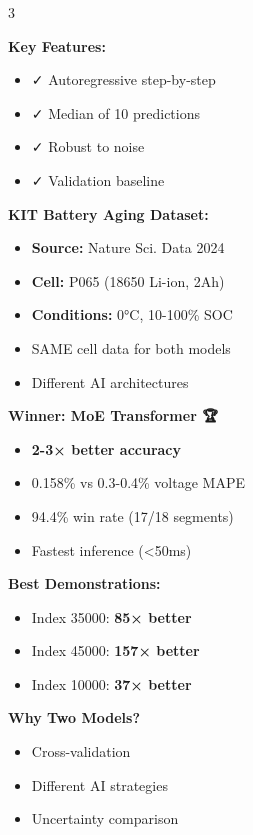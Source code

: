 \documentclass[final,a0paper,portrait]{a0poster}
\begin{document}
\begin{multicols}{3}
\begin{bluebox}[title=🔬 Model 2: Deep Ensemble]
\textbf{Key Features:}
\begin{itemize}
    \item ✓ Autoregressive step-by-step
    \item ✓ Median of 10 predictions
    \item ✓ Robust to noise
    \item ✓ Validation baseline
\end{itemize}
\end{bluebox}

\vspace{1cm}

\begin{orangebox}[title=📊 Dataset]
\large
\textbf{KIT Battery Aging Dataset:}

\begin{itemize}
    \item \textbf{Source:} Nature Sci. Data 2024
    \item \textbf{Cell:} P065 (18650 Li-ion, 2Ah)
    \item \textbf{Conditions:} 0°C, 10-100\% SOC
    \item SAME cell data for both models
    \item Different AI architectures
\end{itemize}
\end{orangebox}

\vspace{1cm}

\begin{bluebox}[title=✨ Key Findings]
\large

\textbf{Winner: MoE Transformer 🏆}
\begin{itemize}
    \item \textbf{2-3× better accuracy}
    \item 0.158\% vs 0.3-0.4\% voltage MAPE
    \item 94.4\% win rate (17/18 segments)
    \item Fastest inference (<50ms)
\end{itemize}

\textbf{Best Demonstrations:}
\begin{itemize}
    \item Index 35000: \textbf{85× better}
    \item Index 45000: \textbf{157× better}
    \item Index 10000: \textbf{37× better}
\end{itemize}

\textbf{Why Two Models?}
\begin{itemize}
    \item Cross-validation
    \item Different AI strategies
    \item Uncertainty comparison
\end{itemize}
\end{bluebox}


\end{multicols}
\end{document}
